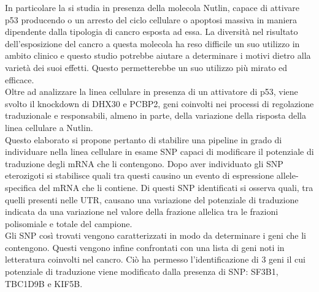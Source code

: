In particolare la si studia in presenza della molecola Nutlin, capace di attivare p53 producendo o un arresto del ciclo cellulare o apoptosi massiva in maniera dipendente dalla tipologia di cancro esposta ad essa.
La diversit\`a nel risultato dell'esposizione del cancro a questa molecola ha reso difficile un suo utilizzo in ambito clinico e questo studio potrebbe aiutare a determinare i motivi dietro alla variet\`a dei suoi effetti.
Questo permetterebbe un suo utilizzo pi\`u mirato ed efficace.\\
Oltre ad analizzare la linea cellulare in presenza di un attivatore di p53, viene svolto il knockdown di DHX30 e PCBP2, geni coinvolti nei processi di regolazione traduzionale e responsabili, almeno in parte, della variazione della risposta della linea cellulare a Nutlin.\\[12pt]
Questo elaborato si propone pertanto di stabilire una pipeline in grado di individuare nella linea cellulare in esame SNP capaci di modificare il potenziale di traduzione degli mRNA che li contengono.
Dopo aver individuato gli SNP eterozigoti si stabilisce quali tra questi causino un evento di espressione allele-specifica del mRNA che li contiene.
Di questi SNP identificati si osserva quali, tra quelli presenti nelle UTR, causano una variazione del potenziale di traduzione indicata da una variazione nel valore della frazione allelica tra le frazioni polisomiale e totale del campione.\\
Gli SNP cos\`i trovati vengono caratterizzati in modo da determinare i geni che li contengono.
Questi vengono infine confrontati con una lista di geni noti in letteratura coinvolti nel cancro.
Ci\`o ha permesso l'identificazione di $3$ geni il cui potenziale di traduzione viene modificato dalla presenza di SNP: SF3B1, TBC1D9B e KIF5B.
